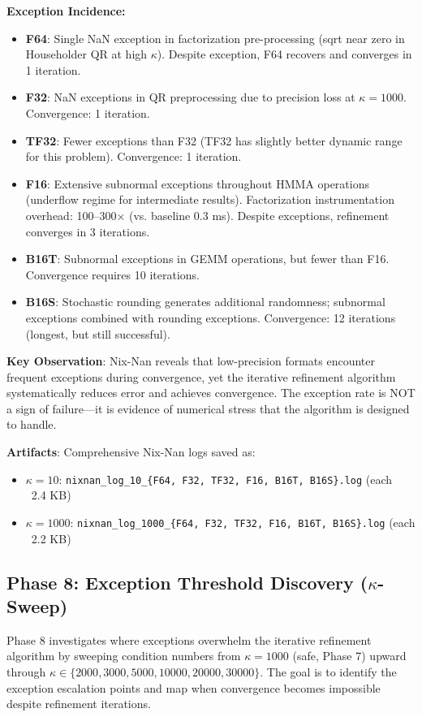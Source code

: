 \documentclass[11pt,a4paper]{article}
\begin{document}
\textbf{Exception Incidence:}
\begin{itemize}
  \item \textbf{F64}: Single NaN exception in factorization pre-processing (sqrt near zero in Householder QR at high $\kappa$). Despite exception, F64 recovers and converges in 1 iteration.
  \item \textbf{F32}: NaN exceptions in QR preprocessing due to precision loss at $\kappa=1000$. Convergence: 1 iteration.
  \item \textbf{TF32}: Fewer exceptions than F32 (TF32 has slightly better dynamic range for this problem). Convergence: 1 iteration.
  \item \textbf{F16}: Extensive subnormal exceptions throughout HMMA operations (underflow regime for intermediate results). Factorization instrumentation overhead: 100--300× (vs. baseline 0.3 ms). Despite exceptions, refinement converges in 3 iterations.
  \item \textbf{B16T}: Subnormal exceptions in GEMM operations, but fewer than F16. Convergence requires 10 iterations.
  \item \textbf{B16S}: Stochastic rounding generates additional randomness; subnormal exceptions combined with rounding exceptions. Convergence: 12 iterations (longest, but still successful).
\end{itemize}

\textbf{Key Observation}: Nix-Nan reveals that low-precision formats encounter frequent exceptions during convergence, yet the iterative refinement algorithm systematically reduces error and achieves convergence. The exception rate is NOT a sign of failure—it is evidence of numerical stress that the algorithm is designed to handle.

\textbf{Artifacts}: Comprehensive Nix-Nan logs saved as:
\begin{itemize}
  \item $\kappa=10$: \texttt{nixnan\_log\_10\_\{F64, F32, TF32, F16, B16T, B16S\}.log} (each ~2.4 KB)
  \item $\kappa=1000$: \texttt{nixnan\_log\_1000\_\{F64, F32, TF32, F16, B16T, B16S\}.log} (each ~2.2 KB)
\end{itemize}

\subsection{Phase 8: Exception Threshold Discovery ($\kappa$-Sweep)}

Phase 8 investigates where exceptions overwhelm the iterative refinement algorithm by sweeping condition numbers from $\kappa=1000$ (safe, Phase 7) upward through $\kappa \in \{2000, 3000, 5000, 10000, 20000, 30000\}$. The goal is to identify the exception escalation points and map when convergence becomes impossible despite refinement iterations.
\end{document}
